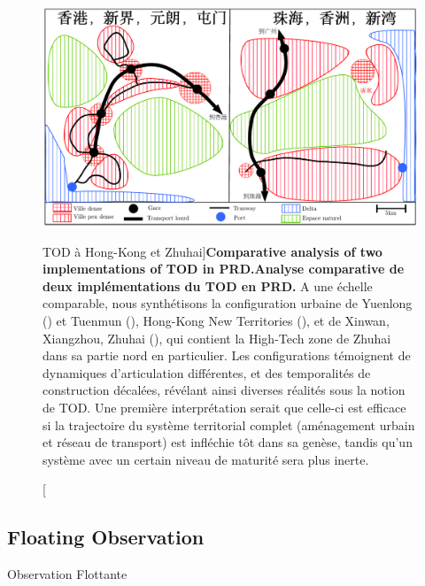 \begin{figure}
	\includegraphics[width=\linewidth]{Figures/Final/1-3-1-fig-qualitative-schema.pdf}
	\caption[TOD in Hong-Kong and Zhuhai][TOD à Hong-Kong et Zhuhai]{\textbf{Comparative analysis of two implementations of TOD in PRD.}\label{fig:qualitative:schema}}{\textbf{Analyse comparative de deux implémentations du TOD en PRD.} A une échelle comparable, nous synthétisons la configuration urbaine de Yuenlong () et Tuenmun (), Hong-Kong New Territories (), et de Xinwan, Xiangzhou, Zhuhai (), qui contient la High-Tech zone de Zhuhai dans sa partie nord en particulier. Les configurations témoignent de dynamiques d'articulation différentes, et des temporalités de construction décalées, révélant ainsi diverses réalités sous la notion de TOD. Une première interprétation serait que celle-ci est efficace si la trajectoire du système territorial complet (aménagement urbain et réseau de transport) est infléchie tôt dans sa genèse, tandis qu'un système avec un certain niveau de maturité sera plus inerte.\label{fig:qualitative:schema}}
\end{figure}




\subsection{Floating Observation}{Observation Flottante}


